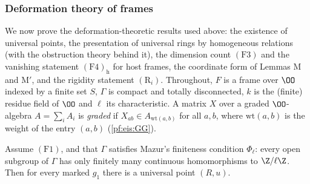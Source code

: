\subsubsection{Deformation theory of frames}\label{sec:pf:eis:framedef}

We now prove the deformation-theoretic results used above: the existence of universal points, the presentation of
universal rings by homogeneous relations (with the obstruction theory behind it), the dimension count $(\mathrm{F3})$ and the
vanishing statement $(\mathrm{F4})_{\mathrm h}$ for host frames, the coordinate form of Lemmas M and M$'$, and the rigidity statement
$(\mathrm{R}_i)$. Throughout, $F$ is a frame over $\OO$ indexed by a finite set $S$, $\Gamma$ is compact and totally
disconnected, $k$ is the (finite) residue field of $\OO$ and $\ell$ its characteristic. A matrix $X$ over a graded
$\OO$-algebra $A=\sum_iA_i$ is \emph{graded} if $X_{ab}\in A_{\mathrm{wt}(a,b)}$ for all $a,b$, where $\mathrm{wt}(a,b)$ is the weight of the
entry $(a,b)$ (\cref{pf:eis:GG}).

\begin{lemma}\label{pf:eis:univ}
Assume $(\mathrm{F1})$, and that $\Gamma$ satisfies Mazur's finiteness condition $\Phi_\ell$: every open subgroup of $\Gamma$ has only
finitely many continuous homomorphisms to $\Z/\ell\Z$. Then for every marked $g_1$ there is a universal point $(R,u)$.
\end{lemma}

